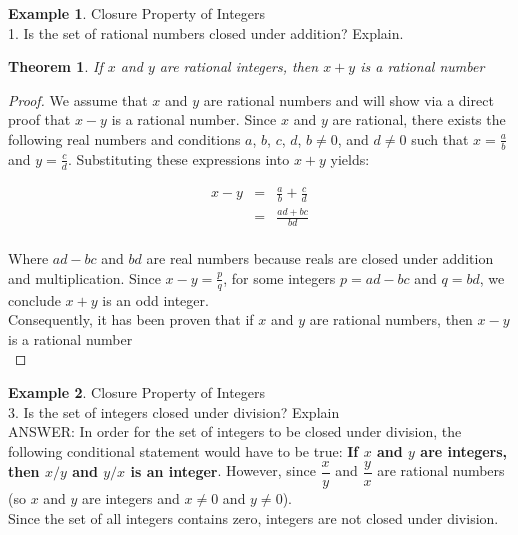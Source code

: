 \documentclass{book}
\newtheorem{theorem}{Theorem}[section]
\theoremstyle{definition}
\newtheorem{example}{Example}[definition]
\theoremstyle{remark}
\begin{document}
\begin{example}
Closure Property of Integers \cite[Chap.1, P.C.1.7, Q.2]{ted} \\

1. Is the set of rational numbers closed under addition? Explain. \\

\begin{tcolorbox}
    \begin{theorem}
        If $x$ and $y$ are rational integers, then $x + y$ is a rational number
    \end{theorem}
\end{tcolorbox}

\begin{proof}
    We assume that $x$ and $y$ are rational numbers and will show via a direct proof that $x - y$ is a rational number. Since $x$ and $y$ are rational, there exists the following real numbers and conditions $a$, $b$, $c$, $d$,  $b \neq 0$, and $d \neq 0$ such that $x = \frac{a}{b}$ and $y = \frac{c}{d}$. Substituting these expressions into $x + y$ yields:
    
    \begin{eqnarray*}
        x - y & = & \frac{a}{b} + \frac{c}{d} \nonumber \\
        & = & \frac{ad + bc}{bd} \nonumber \\
    \end{eqnarray*}
    
    Where $ad - bc$ and $bd$ are real numbers because reals are closed under addition and multiplication. Since $x - y = \frac{p}{q}$, for some integers $p = ad - bc$ and $q = bd$, we conclude $x + y$ is an odd integer. \\
    Consequently, it has been proven that if $x$ and $y$ are rational numbers, then $x - y$ is a rational number \\
\end{proof}
\end{example}


\begin{example}
Closure Property of Integers \cite[Chap.1, P.C.1.7, Q.3]{ted} \\

3. Is the set of integers closed under division? Explain \\

ANSWER: In order for the set of integers to be closed under division, the following conditional statement would have to be true: {\bf If $x$ and $y$ are integers, then $x/y$ and $y/x$ is an integer}. However, since $\dfrac{x}{y}$ and $\dfrac{y}{x}$ are rational numbers (so $x$ and $y$ are integers and  $x \neq 0$ and $y \neq 0$). \\

Since the set of all integers contains zero, integers are not closed under division. \\
\end{example}
\end{document}
